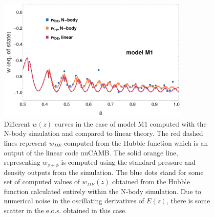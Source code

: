 \begin{figure}
\centering{}
\includegraphics[width=0.85\textwidth]{Chapters/gnq/figures/wDEmeasured-nuphi-modelM1}
\protect\protect\protect\caption[Different $w(z)$ curves in the case
of model M1 computed with the N-body simulation and compared to linear
theory in GNQ.]{\label{fig:Wnuphi-Wde-model2} Different $w(z)$ curves in the case
of model M1 computed with the N-body simulation and compared to linear
theory. The red dashed lines represent $w_{DE}$ computed from the
Hubble function which is an output of the linear code nuCAMB. The
solid orange line, representing $w_{\nu+\phi}$ is computed using
the standard pressure and density outputs from the simulation. The
blue dots stand for some set of computed values of $w_{DE}(z)$ obtained
from the Hubble function calculated entirely within the N-body simulation.
Due to numerical noise in the oscillating derivatives of $E(z)$,
there is some scatter in the e.o.s. obtained in this case.}
\end{figure}
